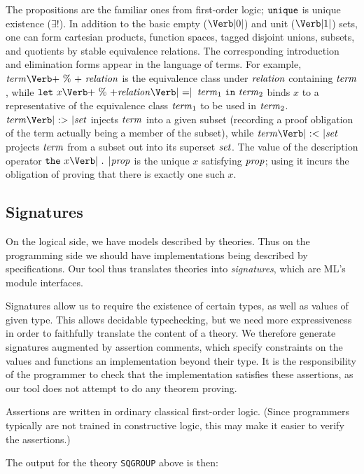   The propositions are the familiar ones from first-order logic;
  $\mbox{\texttt{unique}}$ is unique existence ($\exists!$). In addition to the basic
  empty ($\ZERO$) and unit ($\ONE$) sets, one can form cartesian
  products, function spaces, tagged disjoint unions, subsets, and
  quotients by stable equivalence relations. The corresponding
  introduction and elimination forms appear in the language of terms.
  For example, $\Term\PERCENT\ \metav{relation}$ is the equivalence
  class under $\mbox{\textit{relation}}$ containing $\mbox{\textit{term}}$, while $\LET\ x
  \PERCENT \metav{relation} \mbox{\Verb| =|}$ $ \mbox{\textit{term}}_1\ \mbox{\texttt{in}}\ \mbox{\textit{term}}_2$
  binds $x$ to a representative of the equivalence class $\mbox{\textit{term}}_1$ to
  be used in $\mbox{\textit{term}}_2$. $\Term \SUBIN \Set$ injects $\mbox{\textit{term}}$ into a
  given subset (recording a proof obligation of the term actually
  being a member of the subset), while $\Term \SUBOUT \Set$ projects
  $\mbox{\textit{term}}$ from a subset out into its superset $\mbox{\textit{set}}$.  The value of
  the description operator $\THE\ x\PERIOD \Prop$ is the unique $x$
  satisfying $\mbox{\textit{prop}}$; using it incurs the obligation of proving that
  there is exactly one such $x$.


\subsection{Signatures}
\label{sec:signatures}

On the logical side, we have models described by theories.  Thus on
the programming side we should have implementations being described by
specifications.  Our tool thus translates theories into
\emph{signatures}, which are ML's module interfaces.

Signatures allow us to require the existence of certain types, as well
as values of given type.  This allows decidable typechecking, but we
need more expressiveness in order to faithfully translate the content
of a theory.  We therefore generate signatures augmented by assertion
comments, which specify constraints on the values and functions an
implementation beyond their type.  It is the responsibility of the
programmer to check that the implementation satisfies these
assertions, as our tool does not attempt to do any theorem proving.

Assertions are written in ordinary classical first-order logic. (Since
programmers typically are not trained in constructive logic, this
may make it easier to verify the assertions.)

The output for the theory \Verb|SQGROUP| above is then:

